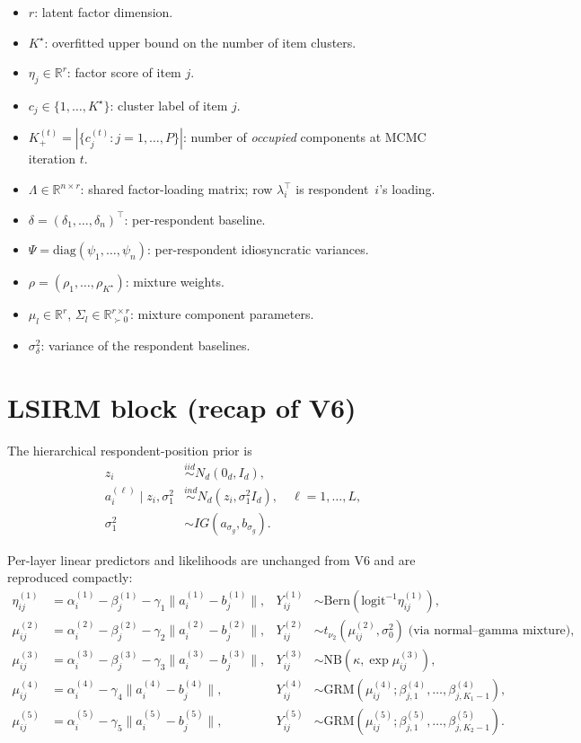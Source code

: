 \documentclass[11pt]{article}
\begin{document}
\begin{itemize}[leftmargin=1.5em]
    \item $r$: latent factor dimension.
    \item $K^\star$: overfitted upper bound on the number of item clusters.
    \item $\eta_j\in\mathbb{R}^r$: factor score of item $j$.
    \item $c_j\in\{1,\dots,K^\star\}$: cluster label of item $j$.
    \item $K_+^{(t)}=|\{c_j^{(t)}:j=1,\dots,P\}|$: number of \emph{occupied} components at MCMC iteration $t$.
    \item $\Lambda\in\mathbb{R}^{n\times r}$: shared factor-loading matrix; row $\lambda_i^\top$ is respondent~$i$'s loading.
    \item $\delta=(\delta_1,\dots,\delta_n)^\top$: per-respondent baseline.
    \item $\Psi=\mathrm{diag}(\psi_1,\dots,\psi_n)$: per-respondent idiosyncratic variances.
    \item $\rho=(\rho_1,\dots,\rho_{K^\star})$: mixture weights.
    \item $\mu_l\in\mathbb{R}^r$, $\Sigma_l\in\mathbb{R}^{r\times r}_{\succ 0}$: mixture component parameters.
    \item $\sigma_\delta^2$: variance of the respondent baselines.
\end{itemize}

\section{LSIRM block (recap of V6)}

The hierarchical respondent-position prior is
\begin{align}
z_i &\overset{iid}{\sim} N_d(0_d,I_d),\\
a_i^{(\ell)}\mid z_i,\sigma_1^2 &\overset{ind}{\sim} N_d(z_i,\sigma_1^2 I_d),
\quad \ell=1,\dots,L,\\
\sigma_1^2 &\sim IG(a_{\sigma_g},b_{\sigma_g}).
\end{align}

Per-layer linear predictors and likelihoods are unchanged from V6 and are reproduced compactly:
\begin{align*}
\eta_{ij}^{(1)} &= \alpha_i^{(1)}-\beta_j^{(1)}-\gamma_1\|a_i^{(1)}-b_j^{(1)}\|, & Y_{ij}^{(1)}&\sim\mathrm{Bern}(\mathrm{logit}^{-1}\eta_{ij}^{(1)}),\\
\mu_{ij}^{(2)} &= \alpha_i^{(2)}-\beta_j^{(2)}-\gamma_2\|a_i^{(2)}-b_j^{(2)}\|, & Y_{ij}^{(2)}&\sim t_{\nu_2}(\mu_{ij}^{(2)},\sigma_0^2)\;\text{(via normal--gamma mixture)},\\
\mu_{ij}^{(3)} &= \alpha_i^{(3)}-\beta_j^{(3)}-\gamma_3\|a_i^{(3)}-b_j^{(3)}\|, & Y_{ij}^{(3)}&\sim\mathrm{NB}(\kappa,\exp \mu_{ij}^{(3)}),\\
\mu_{ij}^{(4)} &= \alpha_i^{(4)}-\gamma_4\|a_i^{(4)}-b_j^{(4)}\|, & Y_{ij}^{(4)}&\sim \text{GRM}(\mu_{ij}^{(4)};\beta_{j,1}^{(4)},\dots,\beta_{j,K_1-1}^{(4)}),\\
\mu_{ij}^{(5)} &= \alpha_i^{(5)}-\gamma_5\|a_i^{(5)}-b_j^{(5)}\|, & Y_{ij}^{(5)}&\sim \text{GRM}(\mu_{ij}^{(5)};\beta_{j,1}^{(5)},\dots,\beta_{j,K_2-1}^{(5)}).
\end{align*}
\end{document}

